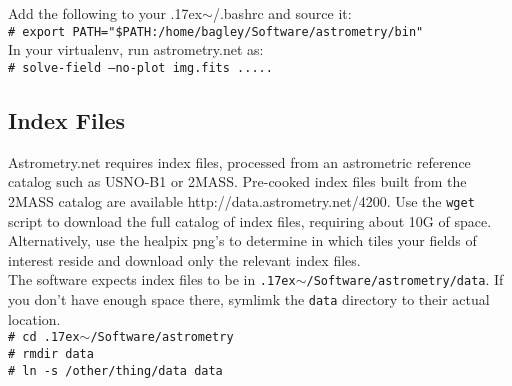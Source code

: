 \documentclass{article}
\newcommand{\ttsim}{\raise.17ex\hbox{$\scriptstyle\mathtt{\sim}$}}
\newcommand{\shellcmd}[1]{\indent\indent\texttt{\footnotesize\# #1}\\}
\begin{document}
\noindent Add the following to your \ttsim/.bashrc and source it: \\
\shellcmd{export PATH="\$PATH:/home/bagley/Software/astrometry/bin"} 

\noindent In your virtualenv, run astrometry.net as: \\
\shellcmd{solve-field --no-plot img.fits .....}

\subsection{Index Files}
Astrometry.net requires index files, processed from an astrometric reference
catalog such as USNO-B1 or 2MASS. Pre-cooked index files built from the 
2MASS catalog are available 
{http://data.astrometry.net/4200}. Use the \texttt{wget} script to download
the full catalog of index files, requiring about 10G of space. Alternatively, 
use the healpix png's to determine in which tiles your fields of interest
reside and download only the relevant index files. \\

\noindent The software expects index files to be in 
\texttt{\ttsim/Software/astrometry/data}. If you don't have enough space
there, symlimk the \texttt{data} directory to their actual location. \\
\shellcmd{cd \ttsim/Software/astrometry}
\shellcmd{rmdir data}
\shellcmd{ln -s /other/thing/data data}
\end{document}
